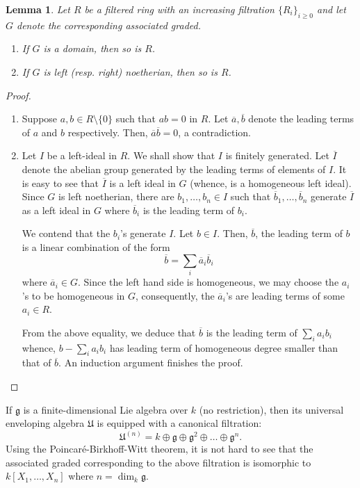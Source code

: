 \documentclass[12pt]{article}
\theoremstyle{thmstyle}
\newtheorem{lemma}[theorem]{Lemma}
\theoremstyle{defstyle}
\newcommand{\frakg}{\mathfrak{g}}
\newcommand{\frakU}{\mathfrak{U}}
\renewcommand{\ge}{\geqslant}
\begin{document}
\begin{lemma}
    Let $R$ be a filtered ring with an increasing filtration $\{R_i\}_{i\ge 0}$ and let $G$ denote the corresponding associated graded.
    \begin{enumerate}[label=(\alph*)]
        \item If $G$ is a domain, then so is $R$.
        \item If $G$ is left (resp. right) noetherian, then so is $R$.
    \end{enumerate}
\end{lemma}
\begin{proof}
\begin{enumerate}[label=(\alph*)]
    \item Suppose $a,b\in R\setminus\{0\}$ such that $ab = 0$ in $R$. Let $\overline a, \overline b$ denote the leading terms of $a$ and $b$ respectively. Then, $\overline a\overline b = 0$, a contradiction.

    \item Let $I$ be a left-ideal in $R$. We shall show that $I$ is finitely generated. Let $\overline I$ denote the abelian group generated by the leading terms of elements of $I$. It is easy to see that $\overline I$ is a left ideal in $G$ (whence, is a homogeneous left ideal). Since $G$ is left noetherian, there are $b_1,\dots,b_n\in I$ such that $\overline b_1,\dots,\overline b_n$ generate $\overline I$ as a left ideal in $G$ where $\overline b_i$ is the leading term of $b_i$.

    We contend that the $b_i$'s generate $I$. Let $b\in I$. Then, $\overline b$, the leading term of $b$ is a linear combination of the form 
    \begin{equation*}
        \overline b = \sum_{i} \overline a_i\overline b_i
    \end{equation*}
    where $\overline a_i\in G$. Since the left hand side is homogeneous, we may choose the $a_i$'s to be homogeneous in $G$, consequently, the $\overline a_i$'s are leading terms of some $a_i\in R$. 

    From the above equality, we deduce that $\overline b$ is the leading term of $\sum_i a_ib_i$ whence, $b - \sum_{i} a_ib_i$ has leading term of homogeneous degree smaller than that of $\overline b$. An induction argument finishes the proof.\qedhere
\end{enumerate}
\end{proof}

If $\frakg$ is a finite-dimensional Lie algebra over $k$ (no restriction), then its universal enveloping algebra $\frakU$ is equipped with a canonical filtration: 
\begin{equation*}
    \frakU^{(n)} = k\oplus\frakg\oplus\frakg^2\oplus\dots\oplus\frakg^{n}.
\end{equation*}
Using the Poincar\'e-Birkhoff-Witt theorem, it is not hard to see that the associated graded corresponding to the above filtration is isomorphic to $k[X_1,\dots,X_n]$ where $n = \dim_k\frakg$.
\end{document}
